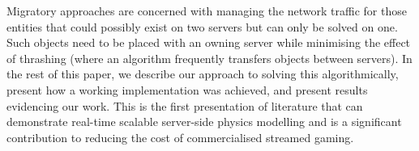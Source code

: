 Migratory approaches are concerned with managing the network traffic for those entities that could possibly exist on two servers but can only be solved on one. Such objects need to be placed with an owning server while minimising the effect of thrashing (where an algorithm frequently transfers objects between servers). In the rest of this paper, we describe our approach to solving this algorithmically, present how a working implementation was achieved, and present results evidencing our work. This is the first presentation of literature that can demonstrate real-time scalable server-side physics modelling and is a significant contribution to reducing the cost of commercialised streamed gaming.

